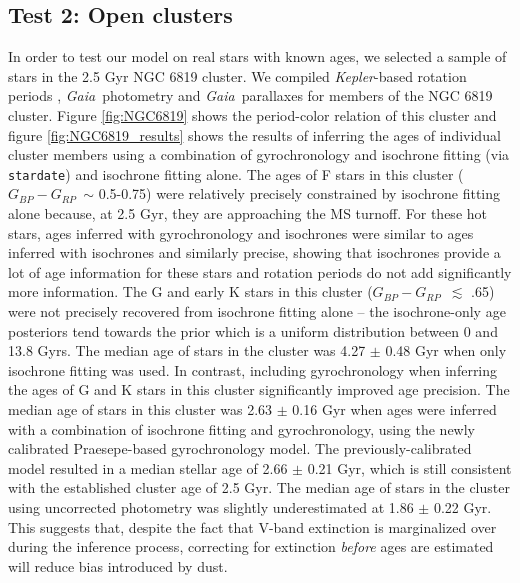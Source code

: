 \documentclass[useAMS, usenatbib, preprint, 12pt]{aastex}
\newcommand{\kepler}{{\it Kepler}}
\newcommand{\Gaia}{{\it Gaia}}
\newcommand{\gaia}{{\it Gaia}}
\newcommand{\sd}{{\tt stardate}}
\newcommand{\gcolor}{$G_{BP} - G_{RP}$}
\begin{document}
\subsection{Test 2: Open clusters}
In order to test our model on real stars with known ages, we selected a sample
of stars in the 2.5 Gyr NGC 6819 cluster.
We compiled \kepler-based rotation periods \citep{meibom2015}, \Gaia\
photometry and \gaia\ parallaxes for members of the NGC 6819 cluster.
Figure \ref{fig:NGC6819} shows the period-color relation of this
cluster and figure \ref{fig:NGC6819_results} shows the results of inferring
the ages of individual cluster members using a combination of gyrochronology
and isochrone fitting (via \sd) and isochrone fitting alone.
The ages of F stars in this cluster (\gcolor\ $\sim$ 0.5-0.75) were relatively
precisely constrained by isochrone fitting alone because, at 2.5 Gyr, they are
approaching the MS turnoff.
For these hot stars, ages inferred with gyrochronology and isochrones were
similar to ages inferred with isochrones and similarly precise, showing that
isochrones provide a lot of age information for these stars and rotation
periods do not add significantly more information.
The G and early K stars in this cluster (\gcolor\ $\lesssim$ .65) were not
precisely recovered from isochrone fitting alone -- the isochrone-only age
posteriors tend towards the prior which is a uniform distribution between 0
and 13.8 Gyrs.
The median age of stars in the cluster was 4.27 $\pm$ 0.48 Gyr when only
isochrone fitting was used.
In contrast, including gyrochronology when inferring the ages of G and K stars
in this cluster significantly improved age precision.
The median age of stars in this cluster was 2.63 $\pm$ 0.16 Gyr when ages were
inferred with a combination of isochrone fitting and gyrochronology, using the
newly calibrated Praesepe-based gyrochronology model.
The previously-calibrated \citet{angus2015} model resulted in a median stellar
age of 2.66 $\pm$ 0.21 Gyr, which is still consistent with the established
cluster age of 2.5 Gyr.
The median age of stars in the cluster using uncorrected photometry was
slightly underestimated at 1.86 $\pm$ 0.22 Gyr.
This suggests that, despite the fact that V-band extinction is marginalized
over during the inference process, correcting for extinction {\it before} ages
are estimated will reduce bias introduced by dust.
\end{document}
